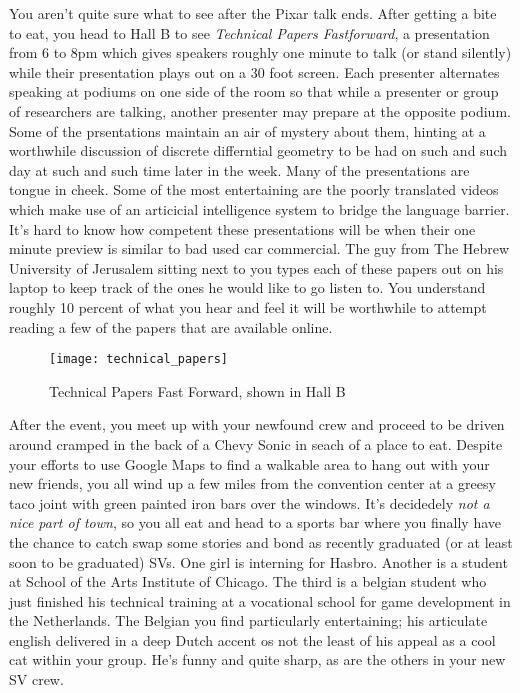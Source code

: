 \documentclass[../main.tex]{subfiles}
\begin{document}
You aren't quite sure what to see after the Pixar talk ends. After getting a bite to eat, you head to Hall B to see \textit{Technical Papers Fastforward}, a presentation from 6 to 8pm which gives speakers roughly one minute to talk (or stand silently) while their presentation plays out on a 30 foot screen. Each presenter alternates speaking at podiums on one side of the room so that while a presenter or group of researchers are talking, another presenter may prepare at the opposite podium. Some of the prsentations maintain an air of mystery about them, hinting at a worthwhile discussion of discrete differntial geometry to be had on such and such day at such and such time later in the week. Many of the presentations are tongue in cheek. Some of the most entertaining are the poorly translated videos which make use of an articicial intelligence system to bridge the language barrier. It's hard to know how competent these presentations will be when their one minute preview is similar to bad used car commercial. The guy from The Hebrew University of Jerusalem sitting next to you types each of these papers out on his laptop to keep track of the ones he would like to go listen to. You understand roughly 10 percent of what you hear and feel it will be worthwhile to attempt reading a few of the papers that are available online.

\begin{figure}[h!]
	\centering
	\texttt{[image: technical\_papers]}
	\caption*{Technical Papers Fast Forward, shown in Hall B}
\end{figure}

After the event, you meet up with your newfound crew and proceed to be driven around cramped in the back of a Chevy Sonic in seach of a place to eat. Despite your efforts to use Google Maps to find a walkable area to hang out with your new friends, you all wind up a few miles from the convention center at a greesy taco joint with green painted iron bars over the windows. It's decidedely \textit{not a nice part of town}, so you all eat and head to a sports bar where you finally have the chance to catch swap some stories and bond as recently graduated (or at least soon to be graduated) SVs. One girl is interning for Hasbro. Another is a student at School of the Arts Institute of Chicago. The third is a belgian student who just finished his technical training at a vocational school for game development in the Netherlands. The Belgian you find particularly entertaining; his articulate english delivered in a deep Dutch accent os not the least of his appeal as a cool cat within your group. He's funny and quite sharp, as are the others in your new SV crew. 
\end{document}
